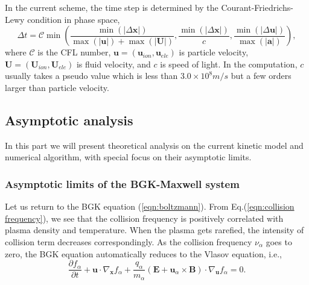 \documentclass[preprint,3p,12pt,sort&compress]{elsarticle}
\begin{document}
In the current scheme, the time step is determined by the Courant-Friedrichs-Lewy condition in phase space,
\begin{equation}
\Delta t=\mathcal{C} \min \left( 
\frac{\min (|\Delta \mathbf x|)}{\max (|\mathbf u|)+\max (|\mathbf U|)}, 
\frac{\min (|\Delta \mathbf x|)}{c} ,
\frac{\min (|\Delta \mathbf u|)}{\max (|\mathbf a|)}
\right),
\end{equation}
where $\mathcal{C}$ is the CFL number, $\mathbf u=(\mathbf u_{ion}, \mathbf u_{ele})$ is particle velocity, $\mathbf U=(\mathbf U_{ion}, \mathbf U_{ele})$ is fluid velocity, and $c$ is speed of light.
In the computation, $c$ usually takes a pseudo value which is less than $3.0 \times 10^8 m/s$ but a few orders larger than particle velocity.

\subsection{Asymptotic analysis}

In this part we will present theoretical analysis on the current kinetic model and numerical algorithm, with special focus on their asymptotic limits.

\subsubsection{Asymptotic limits of the BGK-Maxwell system}

Let us return to the BGK equation (\ref{eqn:boltzmann}).
From Eq.(\ref{eqn:collision frequency}), we see that the collision frequency is positively correlated with plasma density and temperature.
When the plasma gets rarefied, the intensity of collision term decreases correspondingly.
As the collision frequency $\nu_\alpha$ goes to zero, the BGK equation automatically reduces to the Vlasov equation, i.e.,
\begin{equation}
\frac{\partial f_{\alpha}}{\partial t}+\mathbf{u} \cdot \nabla_{\mathbf{x}} f_{\alpha}+\frac{q_{\alpha}}{m_{\alpha}}\left(\mathbf{E}+\mathbf{u}_{\alpha} \times \mathbf{B}\right) \cdot \nabla_{\mathbf{u}} f_{\alpha}=0.
\label{eqn:vlasov}
\end{equation}
\end{document}
